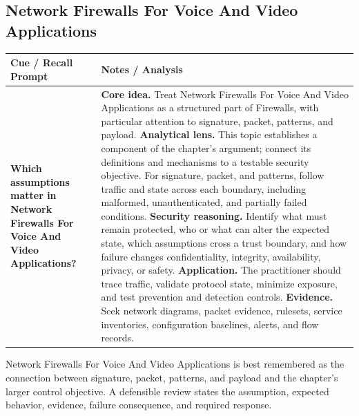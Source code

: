 \documentclass[11pt]{article}
\newcommand{\CornellHeader}{%
\rowcolor{Navy}\color{white}\bfseries Cue / Recall Prompt & \color{white}\bfseries Notes / Analysis\\\hline}
\newcommand{\CornellRow}[2]{%
\cellcolor{CueGray}\RaggedRight\textbf{#1} & \RaggedRight #2\\\hline}
\begin{document}
\subsection*{Network Firewalls For Voice And Video Applications}
\begin{longtable}{>{\RaggedRight\arraybackslash}p{}|>{\RaggedRight\arraybackslash}p{}}
\CornellHeader
\CornellRow{Which assumptions matter in Network Firewalls For Voice And Video Applications?}{\textbf{Core idea.} Treat Network Firewalls For Voice And Video Applications as a structured part of Firewalls, with particular attention to signature, packet, patterns, and payload. \textbf{Analytical lens.} This topic establishes a component of the chapter's argument; connect its definitions and mechanisms to a testable security objective. For signature, packet, and patterns, follow traffic and state across each boundary, including malformed, unauthenticated, and partially failed conditions. \textbf{Security reasoning.} Identify what must remain protected, who or what can alter the expected state, which assumptions cross a trust boundary, and how failure changes confidentiality, integrity, availability, privacy, or safety. \textbf{Application.} The practitioner should trace traffic, validate protocol state, minimize exposure, and test prevention and detection controls. \textbf{Evidence.} Seek network diagrams, packet evidence, rulesets, service inventories, configuration baselines, alerts, and flow records.}
\end{longtable}
\begin{topicsummary}
Network Firewalls For Voice And Video Applications is best remembered as the connection between signature, packet, patterns, and payload and the chapter's larger control objective. A defensible review states the assumption, expected behavior, evidence, failure consequence, and required response.
\end{topicsummary}
\end{document}

